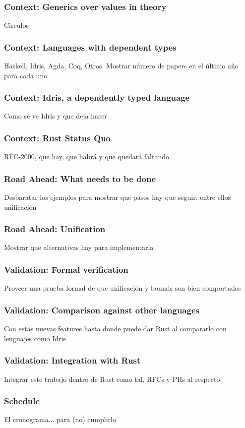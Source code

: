 \documentclass{beamer}
\begin{document}
\begin{frame}[fragile]
    \frametitle{Context: Generics over values in theory}
    Circulos
\end{frame}

\begin{frame}[fragile]
    \frametitle{Context: Languages with dependent types}
    Haskell, Idris, Agda, Coq, Otros. Mostrar número de papers en el último año para cada uno
\end{frame}

\begin{frame}[fragile]
    \frametitle{Context: Idris, a dependently typed language}
    Como se ve Idris y que deja hacer
\end{frame}

\begin{frame}[fragile]
    \frametitle{Context: Rust Status Quo}
    RFC-2000, que hay, que habrá y que quedará faltando
\end{frame}

\begin{frame}[fragile]
    \frametitle{Road Ahead: What needs to be done}
    Desbaratar los ejemplos para mostrar que pasos hay que seguir, entre ellos unificación
\end{frame}

\begin{frame}[fragile]
    \frametitle{Road Ahead: Unification}
    Mostrar que alternativas hay para implementarla
\end{frame}

\begin{frame}[fragile]
    \frametitle{Validation: Formal verification}
    Proveer una prueba formal de que unificación y bounds son bien comportados 
\end{frame}

\begin{frame}[fragile]
    \frametitle{Validation: Comparison against other languages}
    Con estas nuevas features hasta donde puede dar Rust al compararlo con lenguajes como Idris
\end{frame}

\begin{frame}[fragile]
    \frametitle{Validation: Integration with Rust}
    Integrar este trabajo dentro de Rust como tal, RFCs y PRs al respecto
\end{frame}

\begin{frame}[fragile]
    \frametitle{Schedule}
    El cronograma... para (no) cumplirlo
\end{frame}
\end{document}
